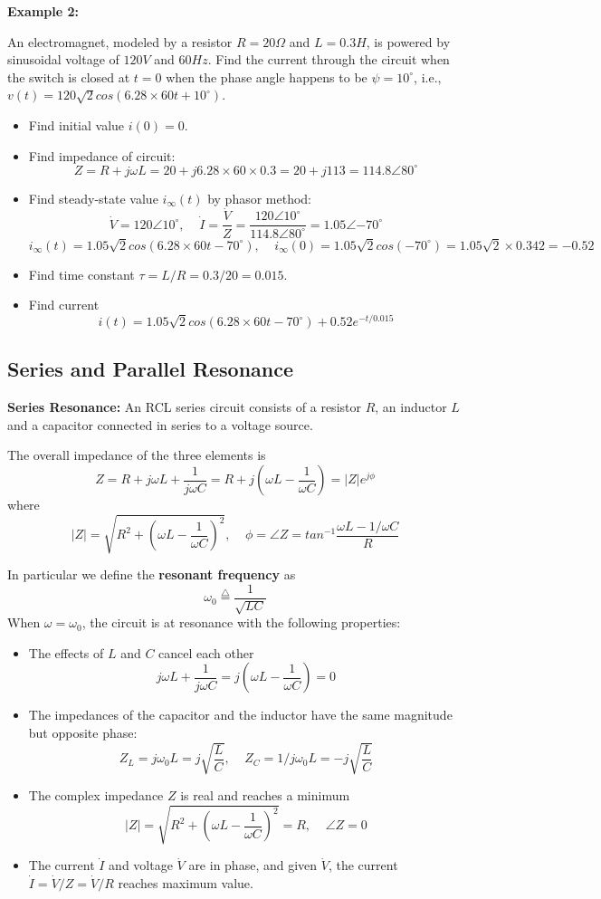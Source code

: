 {\bf Example 2:}

An electromagnet, modeled by a resistor $R=20\Omega$ and $L=0.3H$,
is powered by sinusoidal voltage of $120V$ and $60Hz$. Find the current
through the circuit when the switch is closed at $t=0$ when the phase
angle happens to be $\psi=10^\circ$, i.e., $v(t)=120\sqrt{2}
cos(6.28\times 60 t+10^\circ)$.

\begin{itemize}
\item Find initial value $i(0)=0$. 
\item Find impedance of circuit:
\[ Z=R+j\omega L=20+j6.28\times 60 \times 0.3=20+j113=114.8\angle{80^\circ}	\]
\item Find steady-state value $i_\infty(t)$ by phasor method:
\[
\dot{V}=120 \angle{10^\circ},\;\;\;\;\dot{I}=\frac{\dot{V}}{Z}
	=\frac{120\angle{10^\circ}}{114.8\angle{80^\circ}}
	=1.05\angle{-70^\circ}	
\]
\[	i_\infty(t)=1.05\sqrt{2}cos(6.28\times 60 t -70^\circ)
	,\;\;\;\;i_\infty(0)=1.05\sqrt{2}cos(-70^\circ)
	=1.05\sqrt{2}\times 0.342=-0.52	\]
\item Find time constant $\tau=L/R=0.3/20=0.015$.
\item Find current
\[	i(t)=1.05\sqrt{2}cos(6.28\times 60 t -70^\circ)+0.52 e^{-t/0.015}	\]

\end{itemize}

\subsection*{Series and Parallel Resonance}

{\bf Series Resonance:} An RCL series circuit consists of a resistor $R$, 
an inductor $L$ and a capacitor connected in series to a voltage source.

The overall impedance of the three elements is
\[ Z=R+j\omega L+\frac{1}{j\omega C}=R+j(\omega L-\frac{1}{\omega C})
	=|Z|e^{j\phi}	\]
where
\[	|Z|=\sqrt{R^2+(\omega L-\frac{1}{\omega C})^2},\;\;\;\;
	\phi=\angle Z=tan^{-1} \frac{\omega L-1/\omega C}{R} \]


In particular we define the {\bf resonant frequency} as
\[	\omega_0\stackrel{\triangle}{=}\frac{1}{\sqrt{LC}}	\]
When $\omega=\omega_0$, the circuit is at resonance with the following
properties:
\begin{itemize}
\item The effects of $L$ and $C$ cancel each other
\[	j\omega L+\frac{1}{j\omega C}=j(\omega L-\frac{1}{\omega C})=0 \]
\item The impedances of the capacitor and the inductor have the same 
	magnitude but opposite phase:
\[	Z_L=j\omega_0L=j\sqrt{\frac{L}{C}},\;\;\;\;
	Z_C=1/j\omega_0L=-j\sqrt{\frac{L}{C}}	\]
\item The complex impedance $Z$ is real and reaches a minimum
\[	|Z|=\sqrt{R^2+(\omega L-\frac{1}{\omega C})^2}=R,\;\;\;\;
	\angle Z=0	\]
\item The current $\dot{I}$ and voltage $\dot{V}$ are in phase, and given
	$\dot{V}$, the current $\dot{I}=\dot{V}/Z=\dot{V}/R$ reaches 
	maximum value.
\end{itemize}

